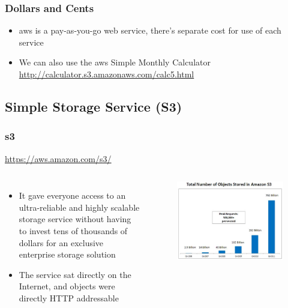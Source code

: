 \documentclass{beamer}
\begin{document}
\begin{frame}
\frametitle{Dollars and Cents}
\begin{itemize}
\item \gls{aws} is a pay-as-you-go web service, there's separate cost for use of each service
\item We can also use the \gls{aws} Simple Monthly Calculator
\url{http://calculator.s3.amazonaws.com/calc5.html}
\end{itemize}
\end{frame}
\subsection{Simple Storage Service (S3)}
\begin{frame}
\frametitle[\gls{s3}]{\acrfull{s3}}
\url{https://aws.amazon.com/s3/}
\begin{columns}
  \begin{itemize}
  \item It gave everyone access to an ultra-reliable and highly scalable storage service without having to invest tens of thousands of dollars for an exclusive enterprise storage solution
  \item The service sat directly on the Internet, and objects were directly HTTP addressable
  \end{itemize}
  \begin{figure}
	\includegraphics[width= 1.0 \textwidth]{aws-s3-growth.eps}
  \end{figure}
\end{columns}
\end{frame}
\end{document}
